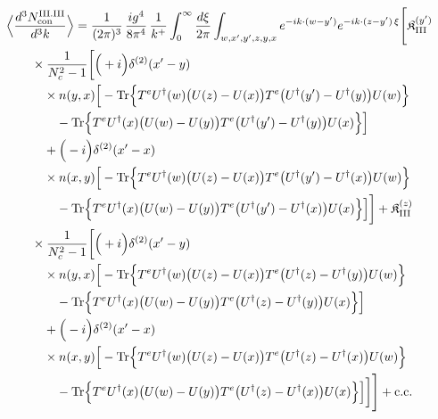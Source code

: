 \begin{align}\label{eq:S-III.III-2}
&\Big\langle\frac{d^{3}N^{\rm III.III}_{{\rm con}}}{d^{3}k}\Big\rangle=\frac{1}{(2\pi)^{3}}\, \frac{ig^{4}}{8\pi^{4}}\, \frac{1}{k^{+}} \int_{0}^{\infty}\frac{d\xi}{2\pi} \int_{w,x',y',z,y,x}e^{-ik\cdot(w-y')}e^{-ik\cdot(z-y')\,\xi}\Bigg[ \mathfrak{K}^{(y')}_{\rm III}\notag\\
&\quad\quad \times \frac{1}{N_{c}^{2}-1}\bigg[\Big(+i\Big)\delta^{(2)}(x'-y)\notag\\
&\quad\quad\quad \times n(y,x)\Big[-{\rm Tr}\Big\{T^{e}U^{\dagger}(w)\big(U(z)-U(x)\big)T^{e}\big(U^{\dagger}(y')-U^{\dagger}(y)\big)U(w)\Big\}\notag\\
&\quad\quad\quad\quad -{\rm Tr}\Big\{T^{e}U^{\dagger}(x)\big(U(w)-U(y)\big)T^{e}\big(U^{\dagger}(y')-U^{\dagger}(y)\big)U(x)\Big\}\Big]\notag\\
&\quad\quad\quad +\Big(-i\Big)\delta^{(2)}(x'-x)\notag\\
&\quad\quad\quad \times n(x,y)\Big[-{\rm Tr}\Big\{T^{e}U^{\dagger}(w)\big(U(z)-U(x)\big)T^{e}\big(U^{\dagger}(y')-U^{\dagger}(x)\big)U(w)\Big\}\notag\\
&\quad\quad\quad\quad -{\rm Tr}\Big\{T^{e}U^{\dagger}(x)\big(U(w)-U(y)\big)T^{e}\big(U^{\dagger}(y')-U^{\dagger}(x)\big)U(x)\Big\}\Big]\bigg] + \mathfrak{K}^{(z)}_{\rm III}\notag\\
&\quad\quad \times \frac{1}{N_{c}^{2}-1}\bigg[\Big(+i\Big)\delta^{(2)}(x'-y)\notag\\
&\quad\quad\quad \times n(y,x)\Big[-{\rm Tr}\Big\{T^{e}U^{\dagger}(w)\big(U(z)-U(x)\big)T^{e}\big(U^{\dagger}(z)-U^{\dagger}(y)\big)U(w)\Big\}\notag\\
&\quad\quad\quad\quad -{\rm Tr}\Big\{T^{e}U^{\dagger}(x)\big(U(w)-U(y)\big)T^{e}\big(U^{\dagger}(z)-U^{\dagger}(y)\big)U(x)\Big\}\Big]\notag\\
&\quad\quad\quad +\Big(-i\Big)\delta^{(2)}(x'-x)\notag\\
&\quad\quad\quad \times n(x,y)\Big[-{\rm Tr}\Big\{T^{e}U^{\dagger}(w)\big(U(z)-U(x)\big)T^{e}\big(U^{\dagger}(z)-U^{\dagger}(x)\big)U(w)\Big\}\notag\\
&\quad\quad\quad\quad -{\rm Tr}\Big\{T^{e}U^{\dagger}(x)\big(U(w)-U(y)\big)T^{e}\big(U^{\dagger}(z)-U^{\dagger}(x)\big)U(x)\Big\}\Big]\bigg]\Bigg] +{\rm c.c.}
\end{align}
